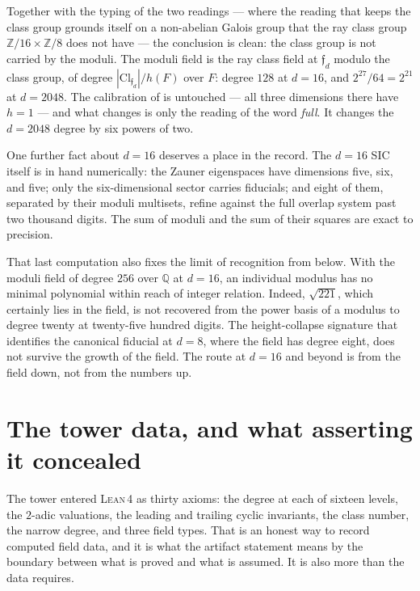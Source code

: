 \documentclass[12pt,a4paper]{article}
\newcommand{\Fd}{F}
\newcommand{\Cl}{\mathrm{Cl}}
\newcommand{\Lean}{\textsc{Lean\,4}}
\begin{document}
Together with the typing of the two readings — where the reading that keeps the class group grounds itself on a non-abelian Galois group that the ray class group $\mathbb{Z}/16\times\mathbb{Z}/8$ does not have — the conclusion is clean: the class group is not carried by the moduli. The moduli field is the ray class field at $\mathfrak{f}_d$ modulo the class group, of degree $|\Cl_{\mathfrak{f}_d}|/h(\Fd)$ over $\Fd$: degree $128$ at $d=16$, and $2^{27}/64 = 2^{21}$ at $d=2048$. The calibration of  is untouched — all three dimensions there have $h=1$ — and what changes is only the reading of the word \emph{full}. It changes the $d=2048$ degree by six powers of two.

One further fact about $d=16$ deserves a place in the record. The $d=16$ SIC itself is in hand numerically: the Zauner eigenspaces have dimensions five, six, and five; only the six-dimensional sector carries fiducials; and eight of them, separated by their moduli multisets, refine against the full overlap system past two thousand digits. The sum of moduli and the sum of their squares are exact to precision.

That last computation also fixes the limit of recognition from below. With the moduli field of degree $256$ over $\mathbb{Q}$ at $d=16$, an individual modulus has no minimal polynomial within reach of integer relation. Indeed, $\sqrt{221}$, which certainly lies in the field, is not recovered from the power basis of a modulus to degree twenty at twenty-five hundred digits. The height-collapse signature that identifies the canonical fiducial at $d=8$, where the field has degree eight, does not survive the growth of the field. The route at $d=16$ and beyond is from the field down, not from the numbers up.

\section{The tower data, and what asserting it concealed}
\label{sec:discharge}

The tower entered \Lean{} as thirty axioms: the degree at each of sixteen
levels, the $2$-adic valuations, the leading and trailing cyclic invariants,
the class number, the narrow degree, and three field types. That is an honest
way to record computed field data, and it is what the artifact statement means
by the boundary between what is proved and what is assumed. It is also more
than the data requires.
\end{document}
